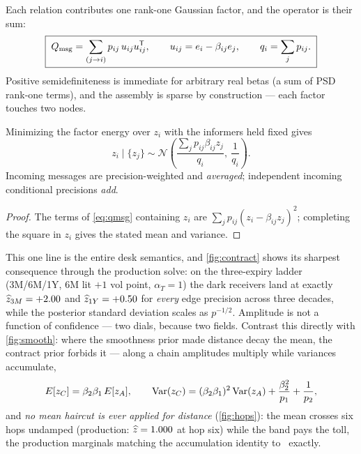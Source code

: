 \documentclass[11pt]{article}
\newcommand{\Qmsg}{Q_{\mathrm{msg}}}
\begin{document}
Each relation contributes one rank-one Gaussian factor, and the operator is
their sum:
\begin{equation}
\boxed{\;
\Qmsg=\sum_{(j\to i)}p_{ij}\,u_{ij}u_{ij}\T,
\qquad
u_{ij}=e_i-\beta_{ij}e_j,
\qquad
q_i=\sum_j p_{ij}.
\;}
\label{eq:qmsg}
\end{equation}
Positive semidefiniteness is immediate for arbitrary real betas (a sum of
PSD rank-one terms), and the assembly is sparse by construction --- each
factor touches two nodes.

\begin{proposition}
\label{prop:conditional}
Minimizing the factor energy over $z_i$ with the informers held fixed gives
\[
z_i\mid\{z_j\}\sim\mathcal N\!\left(
\frac{\sum_jp_{ij}\beta_{ij}z_j}{q_i},\ \frac{1}{q_i}\right).
\]
Incoming messages are precision-weighted and \emph{averaged}; independent
incoming conditional precisions \emph{add}.
\end{proposition}

\begin{proof}
The terms of \eqref{eq:qmsg} containing $z_i$ are
$\sum_jp_{ij}(z_i-\beta_{ij}z_j)^2$; completing the square in $z_i$ gives
the stated mean and variance.
\end{proof}

This one line is the entire desk semantics, and \cref{fig:contract} shows
its sharpest consequence through the production solve: on the three-expiry
ladder (3M/6M/1Y, 6M lit $+1$ vol point, $\alpha_T=1$) the dark receivers
land at exactly $\widehat z_{3M}=+2.00$ and
$\widehat z_{1Y}=+0.50$ for \emph{every} edge precision across three
decades, while the posterior standard deviation scales as $p^{-1/2}$.
Amplitude is not a function of confidence --- two dials, because two
fields.  Contrast this directly with \cref{fig:smooth}: where the
smoothness prior made distance decay the mean, the contract prior forbids
it --- along a chain amplitudes multiply while variances accumulate,
\begin{equation}
E[z_C]=\beta_2\beta_1\,E[z_A],
\qquad
\operatorname{Var}(z_C)=(\beta_2\beta_1)^2\operatorname{Var}(z_A)
+\frac{\beta_2^2}{p_1}+\frac{1}{p_2},
\label{eq:hops}
\end{equation}
and \emph{no mean haircut is ever applied for distance}
(\cref{fig:hops}): the mean crosses six hops undamped (production:
$\widehat z=1.000$ at hop six) while the band pays the toll, the
production marginals matching the accumulation identity to
\gtphopsdgap\ exactly.
\end{document}
